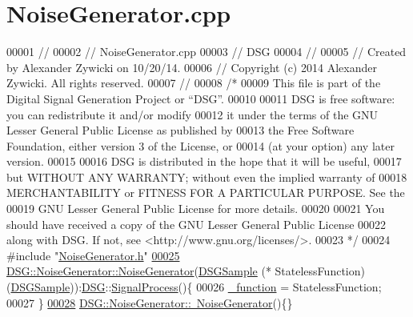 \hypertarget{_noise_generator_8cpp_source}{\section{Noise\+Generator.\+cpp}
\label{_noise_generator_8cpp_source}
}

\begin{DoxyCode}
00001 \textcolor{comment}{//}
00002 \textcolor{comment}{//  NoiseGenerator.cpp}
00003 \textcolor{comment}{//  DSG}
00004 \textcolor{comment}{//}
00005 \textcolor{comment}{//  Created by Alexander Zywicki on 10/20/14.}
00006 \textcolor{comment}{//  Copyright (c) 2014 Alexander Zywicki. All rights reserved.}
00007 \textcolor{comment}{//}
00008 \textcolor{comment}{/*}
00009 \textcolor{comment}{ This file is part of the Digital Signal Generation Project or “DSG”.}
00010 \textcolor{comment}{}
00011 \textcolor{comment}{ DSG is free software: you can redistribute it and/or modify}
00012 \textcolor{comment}{ it under the terms of the GNU Lesser General Public License as published by}
00013 \textcolor{comment}{ the Free Software Foundation, either version 3 of the License, or}
00014 \textcolor{comment}{ (at your option) any later version.}
00015 \textcolor{comment}{}
00016 \textcolor{comment}{ DSG is distributed in the hope that it will be useful,}
00017 \textcolor{comment}{ but WITHOUT ANY WARRANTY; without even the implied warranty of}
00018 \textcolor{comment}{ MERCHANTABILITY or FITNESS FOR A PARTICULAR PURPOSE.  See the}
00019 \textcolor{comment}{ GNU Lesser General Public License for more details.}
00020 \textcolor{comment}{}
00021 \textcolor{comment}{ You should have received a copy of the GNU Lesser General Public License}
00022 \textcolor{comment}{ along with DSG.  If not, see <http://www.gnu.org/licenses/>.}
00023 \textcolor{comment}{ */}
00024 \textcolor{preprocessor}{#include "\hyperlink{_noise_generator_8h}{NoiseGenerator.h}"}
\hypertarget{_noise_generator_8cpp_source_l00025}{}\hyperlink{class_d_s_g_1_1_noise_generator_ac78b8347da0c0593d495d9d054821c34}{00025} \hyperlink{class_d_s_g_1_1_noise_generator_ac78b8347da0c0593d495d9d054821c34}{DSG::NoiseGenerator::NoiseGenerator}(\hyperlink{namespace_d_s_g_ac39a94cd27ebcd9c1e7502d0c624894a}{DSGSample} (*
      StatelessFunction)(\hyperlink{namespace_d_s_g_ac39a94cd27ebcd9c1e7502d0c624894a}{DSGSample})):\hyperlink{namespace_d_s_g}{DSG}::\hyperlink{class_d_s_g_1_1_signal_process}{SignalProcess}()\{
00026     \hyperlink{class_d_s_g_1_1_noise_generator_a3fe30476196e0bfa22e314ce9bbd368b}{\_function} = StatelessFunction;
00027 \}
\hypertarget{_noise_generator_8cpp_source_l00028}{}\hyperlink{class_d_s_g_1_1_noise_generator_a964f0af791b5e09e63470bf42ddbce79}{00028} \hyperlink{class_d_s_g_1_1_noise_generator_a964f0af791b5e09e63470bf42ddbce79}{DSG::NoiseGenerator::~NoiseGenerator}()\{\}
\end{DoxyCode}
